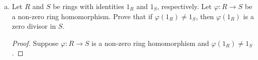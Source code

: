\documentclass[11pt, reqno]{amsart}
\theoremstyle{plain}
\theoremstyle{definition}
\theoremstyle{example}
\begin{document}
\begin{enumerate}[1.]
\begin{enumerate}[(a)]
\begin{proof}
Hence, $\varphi$ is surjective. Now we need to find the kernel of $\varphi$, which is the set of elements that map to $(0, 0) \in \ZZ \times \ZZ$. Note that, in the general matrix, $$\begin{pmatrix} a & b \\ 0 & d \end{pmatrix}$$

we must have $a, d = 0$ in order for $\varphi\left(\begin{pmatrix} a & b \\ 0 & d \end{pmatrix}\right) = (0, 0)$. Thus,
\begin{align*}
\text{ker}(\varphi) = \left\{\begin{pmatrix} 0 & b \\ 0 & 0 \end{pmatrix} \ | \ b \in \ZZ\right\}
\end{align*}
\end{proof}

\item Let $R$ and $S$ be rings with identities $1_R$ and $1_S$, respectively. Let $\varphi: R \to S$ be a non-zero ring homomorphism. Prove that if $\varphi(1_R) \neq 1_S$, then $\varphi(1_R)$ is a zero divisor in $S$. 

\begin{proof}
Suppose $\varphi: R \to S$ is a non-zero ring homomorphism and $\varphi(1_R) \neq 1_S$.
\end{proof}

\end{enumerate}






\end{enumerate}
\end{document}
